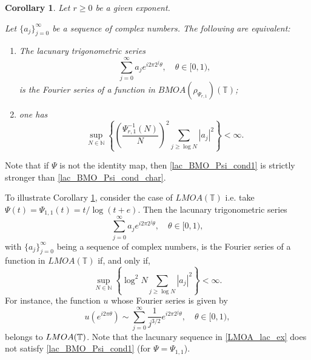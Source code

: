 \documentclass[a4paper, leqno, 10pt]{amsart}
\numberwithin{equation}{section}
\newtheorem{corollary}[thm]{Corollary}
\newcommand{\T}{\mathbb{T}}
\newcommand{\N}{\mathbb{N}}
\begin{document}
\begin{corollary}\label{BMOA_Psi_char_lac}
Let $r \geq 0$ be a given exponent.

Let $\{ a_j \}_{j=0}^{\infty} $ be a sequence of complex numbers. The following are equivalent:
\begin{enumerate}
\item The lacunary trigonometric series 
\[ 
\sum_{j=0}^{\infty} a_j e^{i 2\pi 2^j \theta}, \quad \theta \in [0,1),
\]
is the Fourier series of a function in $BMOA (\rho_{\Psi_{r,1}}) (\T)$;
\item one has
\begin{equation}\label{lac_BMO_Psi_cond_char}
\sup_{N \in \N} \left\{ \left( \frac{\Psi_{r,1}^{-1}(N)}{N}\right)^2 \sum_{j \geq \log N} |a_j|^2 \right\} < \infty.
\end{equation}
\end{enumerate}
\end{corollary}

Note that if $\Psi$ is not the identity map, then \eqref{lac_BMO_Psi_cond1} is  strictly stronger than  \eqref{lac_BMO_Psi_cond_char}. 

To illustrate Corollary \ref{BMOA_Psi_char_lac}, consider the case of $LMOA (\T)$ i.e. take $\Psi (t) = \Psi_{1,1} (t) = t/\log(t+e)$. Then the lacunary trigonometric series 
\[ 
\sum_{j=0}^{\infty} a_j e^{i 2\pi 2^j \theta}, \quad \theta \in [0,1),
\]
with $\{ a_j \}_{j=0}^{\infty} $ being a sequence of complex numbers, 
is the Fourier series of a function in $LMOA (\T)$ if, and only if,
\[ 
\sup_{N \in \N} \left\{ \log^2 N \sum_{j \geq \log N} |a_j|^2 \right\} < \infty.
\]
For instance, the function $u$ whose Fourier series is given by
 \begin{equation}\label{LMOA_lac_ex}
u (e^{i 2\pi \theta}) \sim \sum_{j=0}^{\infty} \frac{1}{j^{3/2}} e^{i 2\pi 2^j \theta}, \quad \theta \in [0,1), 
\end{equation}
belongs to ${\rm LMOA} (\T)$. Note that the lacunary sequence in \eqref{LMOA_lac_ex} does not satisfy \eqref{lac_BMO_Psi_cond1} (for $\Psi= \Psi_{1,1}$). 
 
\end{document}
